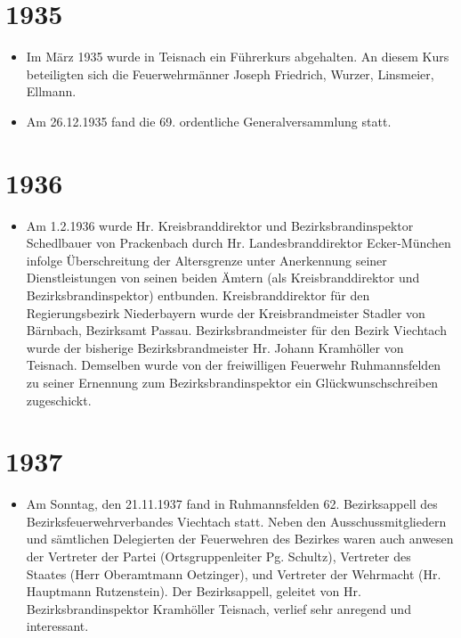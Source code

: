 \documentclass[12pt,a4paper]{book}
\begin{document}
\section*{1935}

\begin{itemize}
\item Im März 1935 wurde in Teisnach ein Führerkurs abgehalten. An
diesem Kurs beteiligten sich die Feuerwehrmänner Joseph Friedrich,
Wurzer, Linsmeier, Ellmann.

\item Am 26.12.1935 fand die 69. ordentliche Generalversammlung statt.
\end{itemize}

\section*{1936}

\begin{itemize}
\item Am 1.2.1936 wurde Hr. Kreisbranddirektor und Bezirksbrandinspektor
Schedlbauer von Prackenbach durch Hr. Landesbranddirektor Ecker-München
infolge Überschreitung der Altersgrenze unter Anerkennung seiner
Dienstleistungen von seinen beiden Ämtern (als Kreisbranddirektor und
Bezirksbrandinspektor) entbunden. Kreisbranddirektor für den
Regierungsbezirk Niederbayern wurde der Kreisbrandmeister Stadler von
Bärnbach, Bezirksamt Passau. Bezirksbrandmeister für den Bezirk
Viechtach wurde der bisherige Bezirksbrandmeister Hr. Johann Kramhöller
von Teisnach. Demselben wurde von der freiwilligen Feuerwehr
Ruhmannsfelden zu seiner Ernennung zum Bezirksbrandinspektor ein
Glückwunschschreiben zugeschickt.
\end{itemize}

\section*{1937}

\begin{itemize}
\item Am Sonntag, den 21.11.1937 fand in Ruhmannsfelden 62.
Bezirksappell des Bezirksfeuerwehrverbandes Viechtach statt. Neben den
Ausschussmitgliedern und sämtlichen Delegierten der Feuerwehren des
Bezirkes waren auch anwesen der Vertreter der Partei (Ortsgruppenleiter
Pg. Schultz), Vertreter des Staates (Herr Oberamtmann Oetzinger), und
Vertreter der Wehrmacht (Hr. Hauptmann Rutzenstein). Der Bezirksappell,
geleitet von Hr. Bezirksbrandinspektor Kramhöller Teisnach, verlief sehr
anregend und interessant.
\end{itemize}
\end{document}
